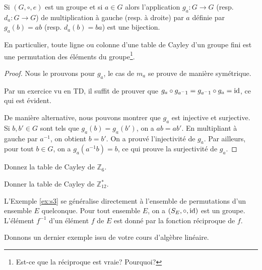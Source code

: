 \documentclass[french,course,oneside,theoremnosection]{lecture}
\newcommand{\Z}{\mathbb{Z}}
\begin{document}
\begin{lemma}
Si $(G, \circ, e)$ est un groupe et si $a\in G$ alors l'application $g_{a}\colon G \to G$ (resp. $d_{a}\colon G \to G$) de multiplication à gauche (resp. à droite) par $a$ définie par $g_{a}(b)=ab$ (resp. $d_a(b)=ba$) est une bijection.

En particulier, toute ligne ou colonne d'une table de Cayley d'un groupe fini est une permutation des éléments du groupe\footnote{Est-ce que la réciproque est vraie? Pourquoi?}.
\end{lemma}
\begin{proof}
Nous le prouvons pour $g_a$, le cas de $m_a$ se prouve de manière symétrique.

Par un exercice vu en TD, il suffit de prouver que $g_a\circ g_{a^-1} = g_{a^-1} \circ g_a = \operatorname{id}$, ce qui est évident.

De manière alternative, nous pouvons montrer que $g_a$ est injective et surjective. Si $b, b' \in G$ sont tels que $g_a(b)=g_a(b')$, on a $ab=ab'$. En multipliant à gauche par $a^{-1}$, on obtient $b=b'$. On a prouvé l'injectivité de $g_a$. Par ailleurs, pour tout $b\in G$, on a $g_a(a^{-1}b)=b$, ce qui prouve la surjectivité de $g_a$.
\end{proof}
\begin{exercise}
Donnez la table de Cayley de $\Z_6$.
\end{exercise}
\begin{exercise}
Donner la table de Cayley de $\Z_{12}^*$.
\end{exercise}
\begin{example}L'Exemple \ref{ex:s3} se généralise directement à l'ensemble de permutations d'un ensemble $E$ quelconque. Pour tout ensemble $E$, on a $(S_E, \circ, \operatorname{id})$ est un groupe. L'élément $f^{-1}$ d'un élément $f$ de $E$ est donné par la fonction réciproque de $f$.
\end{example}

Donnons un dernier exemple issu de votre cours d'algèbre linéaire.
\end{document}
